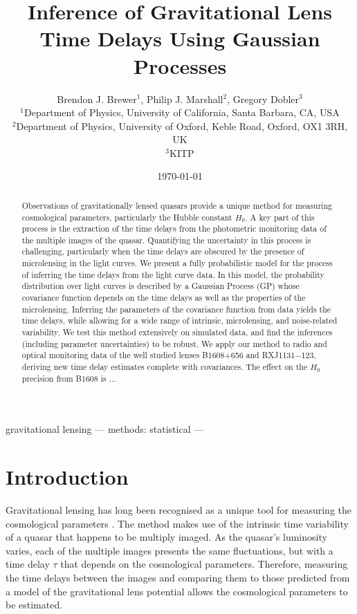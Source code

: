 \documentclass[useAMS,usenatbib, a4paper]{mn2e} \usepackage{natbib}
\title[Time Delays with Gaussian Processes]
{Inference of Gravitational Lens Time Delays Using Gaussian Processes}
\author[B. J. Brewer]{Brendon J. Brewer$^1$, Philip J. Marshall$^2$, Gregory Dobler$^3$ \\
$^1$Department of Physics, University of California, Santa Barbara, CA, USA \\
$^2$Department of Physics, University of Oxford, Keble Road, Oxford, OX1 3RH, UK \\
$^3$KITP}
\begin{document}
 

\date{\today} 
\pagerange{\pageref{firstpage}--\pageref{lastpage}}  
\maketitle \label{firstpage}


\begin{abstract}

Observations of gravitationally lensed quasars provide a unique method for
measuring cosmological parameters, particularly the Hubble constant $H_0$.
A key part of
this process is the extraction of the time delays from the photometric
monitoring data of the multiple images of the quasar. Quantifying the
uncertainty in this process is challenging, particularly when the time delays
are obscured by the presence of microlensing in the light curves. We present a
fully probabilistic model for the process of inferring the time delays from
the light curve data. In this model, the probability distribution over light
curves is described by a Gaussian Process (GP) whose covariance function
depends on the time delays as well as the properties of the microlensing.
Inferring the parameters of the covariance function from data yields
the time delays, while allowing for a wide range of intrinsic, microlensing, and 
noise-related variability. We test this method extensively on simulated data, 
and find the inferences (including parameter uncertainties) to be robust.
We apply our method to radio and optical monitoring data of the well
studied lenses B1608+656 and RXJ1131$-$123, deriving new time delay estimates complete 
with covariances. The effect on the $H_0$ precision from B1608 is ...

\end{abstract}

\begin{keywords} gravitational lensing --- methods: statistical --- 
\end{keywords}


\section{Introduction} 

Gravitational lensing has long been recognised as a unique tool for measuring
the cosmological parameters \citep{schechter}. The method makes use of the
intrinsic time variability of a quasar that happens to be multiply imaged. As
the quasar's luminosity varies, each of the multiple images presents the same
fluctuations, but with a time delay $\tau$ that depends on the cosmological
parameters. Therefore, measuring the time delays between the images and
comparing them to those predicted from a model of the gravitational lens
potential allows the cosmological parameters to be estimated.
\end{document}
